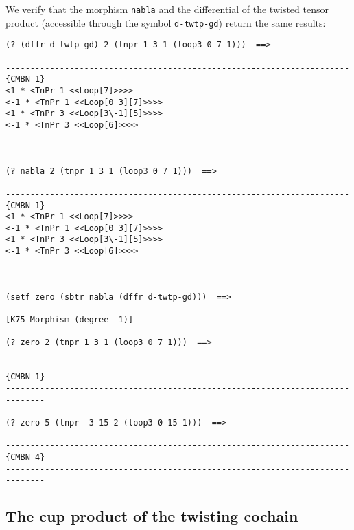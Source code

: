 We verify that the morphism {\tt nabla} and the differential of the
twisted tensor product (accessible
through the symbol {\tt d-twtp-gd}) return the same results:
{\footnotesize\begin{verbatim}
(? (dffr d-twtp-gd) 2 (tnpr 1 3 1 (loop3 0 7 1)))  ==>

----------------------------------------------------------------------{CMBN 1}
<1 * <TnPr 1 <<Loop[7]>>>>
<-1 * <TnPr 1 <<Loop[0 3][7]>>>>
<1 * <TnPr 3 <<Loop[3\-1][5]>>>>
<-1 * <TnPr 3 <<Loop[6]>>>>
------------------------------------------------------------------------------

(? nabla 2 (tnpr 1 3 1 (loop3 0 7 1)))  ==>

----------------------------------------------------------------------{CMBN 1}
<1 * <TnPr 1 <<Loop[7]>>>>
<-1 * <TnPr 1 <<Loop[0 3][7]>>>>
<1 * <TnPr 3 <<Loop[3\-1][5]>>>>
<-1 * <TnPr 3 <<Loop[6]>>>>
------------------------------------------------------------------------------

(setf zero (sbtr nabla (dffr d-twtp-gd)))  ==>

[K75 Morphism (degree -1)]

(? zero 2 (tnpr 1 3 1 (loop3 0 7 1)))  ==>

----------------------------------------------------------------------{CMBN 1}
------------------------------------------------------------------------------

(? zero 5 (tnpr  3 15 2 (loop3 0 15 1)))  ==>

----------------------------------------------------------------------{CMBN 4}
------------------------------------------------------------------------------
\end{verbatim}}

\newpage

\subsection {The cup product of the twisting cochain}


